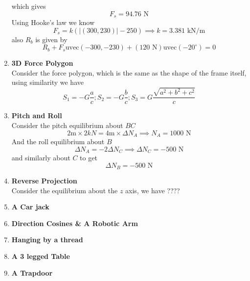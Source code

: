 \documentclass[12pt]{article}
\begin{document}
\begin{enumerate}
which gives
$$
F_{s} = 94.76 \text{ N}
$$
Using Hooke's law we know
$$
F_{s} = k(|(300,230)|-250) \implies k = 3.381 \text{ kN/m}
$$
also $R_{b}$ is given by
$$
R_{b} + F_{s} \text{uvec}(-300,-230) + (120 \text{ N}) \text{uvec} (-20^{\circ}) = 0
$$
\item \textbf{3D Force Polygon} \\
Consider the force polygon, which is the same as the shape of the frame itself, using similarity we have
$$
S_{1} = -G \frac{a}{c}; S_{2} = -G \frac{b}{c};S_{3} = G \frac{\sqrt{ a^{2} + b^{2} + c^{2} }}{c}
$$
\item \textbf{Pitch and Roll} \\
Consider the pitch equilibrium about $BC$ 
$$
2 \text{m} \times 2kN = 4\text{m} \times \Delta N_{A} \implies N_{A} = 1000 \text{ N}
$$
And the roll equilibrium about $B$
$$
\Delta N_{A} = -2 \Delta N_{C} \implies \Delta N_{C} = -500 \text{ N}
$$
and similarly about $C$ to get
$$
\Delta N_{B} = -500 \text{ N}
$$
\item \textbf{Reverse Projection} \\
Consider the equilibrium about the $z$ axis, we have
????
\item \textbf{A Car jack} \\
\item \textbf{Direction Cosines \& A Robotic Arm} \\
\item \textbf{Hanging by a thread} \\
\item \textbf{A 3 legged Table} \\
\item \textbf{A Trapdoor} \\


\end{enumerate}
\end{document}
